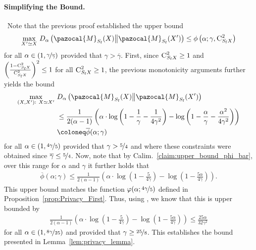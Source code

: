\documentclass[11pt]{article}
\theoremstyle{definition}
\theoremstyle{plain}
\providecommand{\lemmaref}[1]{Lemma~\ref{#1}}
\providecommand{\propositionref}[1]{Proposition~\ref{#1}}
\providecommand{\KLDA}[2]{{D_{\alpha} \left( #1 \middle\| #2 \right)}}
\newcommand{\pM}{\pazocal{M}}
\begin{document}
\paragraph{Simplifying the Bound.}\ 
Note that the previous proof established the upper bound 
\begin{equation}
    \underset{X'\simeq X}{\max} \ \KLDA{\pM_{S_{\mathrm{f}}}(X)}{\pM_{S_{\mathrm{f}}}(X')} \leq \phi\left(\alpha; \gamma, \textsc{C}^2_{S_{\mathrm{f}}X}\right)
\end{equation}
for all $\alpha \in (1, \nicefrac{\gamma}{\overline{\gamma}})$ provided that $\gamma > \overline{\gamma}$. First, since $\textsc{C}^2_{S_{\mathrm{f}}X} \geq 1$ and $\left(\frac{1 - \textsc{C}^2_{S_{\mathrm{f}}X}}{\textsc{C}^2_{S_{\mathrm{f}}X}}\right)^2 \leq 1$ for all $\textsc{C}^2_{S_{\mathrm{f}}X} \geq 1$, the previous monotonicity arguments further yields the bound 
\begin{align}
    \underset{(X,X'):\ X\simeq X'}{\max} \ &\KLDA{\pM_{S_{\mathrm{f}}}(X)}{\pM_{S_{\mathrm{f}}}(X')} \\
    &\leq \frac{1}{2(\alpha - 1)}\left(\alpha\cdot \log\left(1 - \frac{1}{\gamma} - \frac{1}{4\gamma^2}\right) - \log\left(1 - \frac{\alpha}{\gamma} - \frac{\alpha^2}{4\gamma^2}\right)\right) \\
    &\coloneq \overline{\phi}(\alpha;\gamma)
\end{align}
for all $\alpha \in (1, \nicefrac{4\gamma}{5})$ provided that $\gamma > \nicefrac{5}{4}$ and where these constraints were obtained since $\overline{\gamma} \leq \nicefrac{5}{4}$. Now, note that by Calim.~\ref{claim:upper_bound_phi_bar}, over this range for $\alpha$ and $\gamma$ it further holds that 
\begin{align}
    \overline{\phi}(\alpha; \gamma) \leq \frac{1}{2(\alpha - 1)}\left(\alpha \cdot \log\left(1 - \frac{5}{4\gamma}\right) - \log\left(1 - \frac{5\alpha}{4\gamma}\right)\right).
\end{align}
This upper bound matches the function $\varphi(\alpha; \nicefrac{4\gamma}{5})$ defined in \propositionref{prop:Privacy_First}. Thus, using \citet[Corollary.~1]{lev2025gaussianmix}, we know that this is upper bounded by 
\begin{align}
    \frac{1}{2(\alpha - 1)}\left(\alpha \cdot \log\left(1 - \frac{5}{4\gamma}\right) - \log\left(1 - \frac{5\alpha}{4\gamma}\right)\right) \leq \frac{25\alpha}{32\gamma^2}
\end{align}
for all $\alpha \in (1, \nicefrac{8\gamma}{25})$ and provided that $\gamma \geq \nicefrac{25}{8}$. This establishes the bound presented in \lemmaref{lem:privacy_lemma}. \hfill \qedsymbol 
\end{document}
